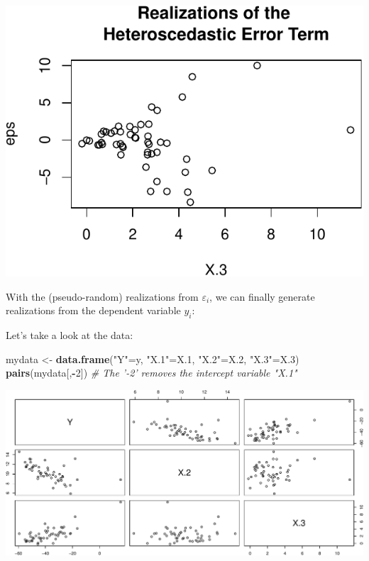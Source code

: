 \documentclass[]{book}
\newenvironment{Shaded}{\begin{snugshade}}{\end{snugshade}}
\newcommand{\CommentTok}[1]{\textcolor[rgb]{0.56,0.35,0.01}{\textit{#1}}}
\newcommand{\DecValTok}[1]{\textcolor[rgb]{0.00,0.00,0.81}{#1}}
\newcommand{\FloatTok}[1]{\textcolor[rgb]{0.00,0.00,0.81}{#1}}
\newcommand{\KeywordTok}[1]{\textcolor[rgb]{0.13,0.29,0.53}{\textbf{#1}}}
\newcommand{\NormalTok}[1]{#1}
\newcommand{\OperatorTok}[1]{\textcolor[rgb]{0.81,0.36,0.00}{\textbf{#1}}}
\newcommand{\StringTok}[1]{\textcolor[rgb]{0.31,0.60,0.02}{#1}}
\theoremstyle{definition}
\theoremstyle{definition}
\theoremstyle{definition}
\theoremstyle{remark}
\begin{document}
\includegraphics{01-Introduction-to-R_files/figure-latex/unnamed-chunk-27-1.pdf}

With the (pseudo-random) realizations from \(\varepsilon_i\), we can finally generate realizations from the dependent variable \(y_i\):

\begin{Shaded}
\end{Shaded}

Let's take a look at the data:

\begin{Shaded}
\begin{Highlighting}[]
\NormalTok{mydata    <-}\StringTok{ }\KeywordTok{data.frame}\NormalTok{(}\StringTok{"Y"}\NormalTok{=y, }\StringTok{"X.1"}\NormalTok{=X}\FloatTok{.1}\NormalTok{, }\StringTok{"X.2"}\NormalTok{=X}\FloatTok{.2}\NormalTok{, }\StringTok{"X.3"}\NormalTok{=X}\FloatTok{.3}\NormalTok{)}
\KeywordTok{pairs}\NormalTok{(mydata[,}\OperatorTok{-}\DecValTok{2}\NormalTok{]) }\CommentTok{# The '-2' removes the intercept variable "X.1"}
\end{Highlighting}
\end{Shaded}

\begin{center}\includegraphics[width=\textwidth]{01-Introduction-to-R_files/figure-latex/unnamed-chunk-29-1} \end{center}
\end{document}
